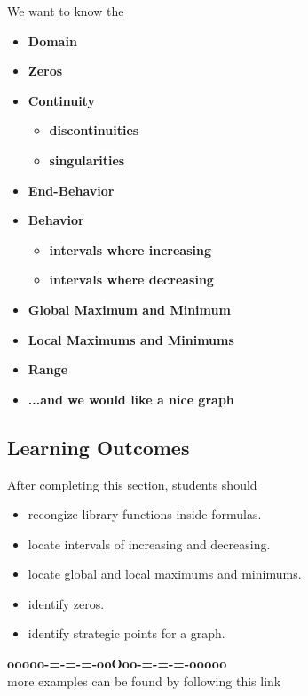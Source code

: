 \documentclass{ximera}
\begin{document}
We want to know the 
\begin{itemize}
     \item \textbf{\textcolor{red!80!black}{Domain}} 
     \item \textbf{\textcolor{red!80!black}{Zeros}} 
     \item \textbf{\textcolor{red!80!black}{Continuity}} 
\begin{itemize}
     \item \textbf{\textcolor{purple!85!blue}{discontinuities}} 
     \item \textbf{\textcolor{purple!85!blue}{singularities}} 
\end{itemize}
     \item \textbf{\textcolor{red!80!black}{End-Behavior}} 
     \item \textbf{\textcolor{red!80!black}{Behavior}} 
\begin{itemize}
     \item \textbf{\textcolor{purple!85!blue}{intervals where increasing}} 
     \item \textbf{\textcolor{purple!85!blue}{intervals where decreasing}} 
\end{itemize}
     \item \textbf{\textcolor{red!80!black}{Global Maximum and Minimum}} 
     \item \textbf{\textcolor{red!80!black}{Local Maximums and Minimums}} 
     \item \textbf{\textcolor{red!80!black}{Range}} 
     \item \textbf{\textcolor{blue!55!black}{...and we would like a nice graph}} 
\end{itemize}








\subsection*{Learning Outcomes}

\begin{sectionOutcomes}
After completing this section, students should 

\begin{itemize}
\item recongize library functions inside formulas.
\item locate intervals of increasing and decreasing.
\item locate global and local maximums and minimums.
\item identify zeros.
\item identify strategic points for a graph.
\end{itemize}
\end{sectionOutcomes}










\begin{center}
\textbf{\textcolor{green!50!black}{ooooo-=-=-=-ooOoo-=-=-=-ooooo}} \\

more examples can be found by following this link\\ 

\end{center}
\end{document}
